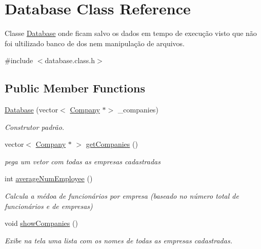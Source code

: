 \hypertarget{classDatabase}{}\section{Database Class Reference}
\label{classDatabase}


Classe \hyperlink{classDatabase}{Database} onde ficam salvo os dados em tempo de execução visto que não foi ultilizado banco de dos nem manipulação de arquivos.  




{\ttfamily \#include $<$database.\+class.\+h$>$}

\subsection*{Public Member Functions}
\begin{DoxyCompactItemize}
\item 
\hyperlink{classDatabase_af78314978b93b94277afe2738c5a91c6}{Database} (vector$<$ \hyperlink{classCompany}{Company} $\ast$$>$ \+\_\+companies)
\begin{DoxyCompactList}\small\item\em Construtor padrão. \end{DoxyCompactList}\item 
vector$<$ \hyperlink{classCompany}{Company} $\ast$ $>$ \hyperlink{classDatabase_a318aca3d5d8984e4cc0783260a18daf3}{get\+Companies} ()
\begin{DoxyCompactList}\small\item\em pega um vetor com todas as empresas cadastradas \end{DoxyCompactList}\item 
int \hyperlink{classDatabase_a89c97fa6d6006fb6ab10981bceb07e56}{average\+Num\+Employee} ()
\begin{DoxyCompactList}\small\item\em Calcula a médoa de funcionários por empresa (baseado no número total de funcionários e de empresas) \end{DoxyCompactList}\item 
\mbox{\label{classDatabase_a68dc9d6a73126ee9efe2c4169b78756d}} 
void \hyperlink{classDatabase_a68dc9d6a73126ee9efe2c4169b78756d}{show\+Companies} ()
\begin{DoxyCompactList}\small\item\em Exibe na tela uma lista com os nomes de todas as empresas cadastradas. \end{DoxyCompactList}\item 
$$
\end{DoxyCompactItemize}
